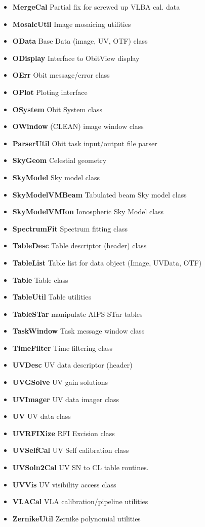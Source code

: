 \documentclass[11pt]{report}
\begin{document}
\begin{itemize}
\item {\bf MergeCal}       Partial fix for screwed up VLBA cal. data
\item {\bf MosaicUtil}     Image mosaicing utilities
\item {\bf OData}          Base Data (image, UV, OTF) class
\item {\bf ODisplay}       Interface to ObitView display
\item {\bf OErr}           Obit message/error class
\item {\bf OPlot}          Ploting interface
\item {\bf OSystem}        Obit System class
\item {\bf OWindow}        (CLEAN) image window class
\item {\bf ParserUtil}     Obit task input/output file parser
\item {\bf SkyGeom}        Celestial geometry
\item {\bf SkyModel}       Sky model class
\item {\bf SkyModelVMBeam} Tabulated beam Sky model class
\item {\bf SkyModelVMIon}  Ionospheric Sky Model class
\item {\bf SpectrumFit}    Spectrum fitting class
\item {\bf TableDesc}      Table descriptor (header) class
\item {\bf TableList}      Table list for data object (Image, UVData, OTF)
\item {\bf Table }         Table class
\item {\bf TableUtil}      Table utilities
\item {\bf TableSTar}      manipulate AIPS STar tables
\item {\bf TaskWindow}     Task message window class
\item {\bf TimeFilter}     Time filtering class
\item {\bf UVDesc}         UV data descriptor (header)
\item {\bf UVGSolve}       UV gain solutions
\item {\bf UVImager}       UV data imager class
\item {\bf UV }            UV data class
\item {\bf UVRFIXize}      RFI Excision class
\item {\bf UVSelfCal}      UV Self calibration class
\item {\bf UVSoln2Cal}     UV SN to CL table routines.
\item {\bf UVVis}          UV visibility access class
\item {\bf VLACal}         VLA calibration/pipeline utilities
\item {\bf ZernikeUtil}    Zernike polynomial utilities
\end{itemize}
\end{document}
